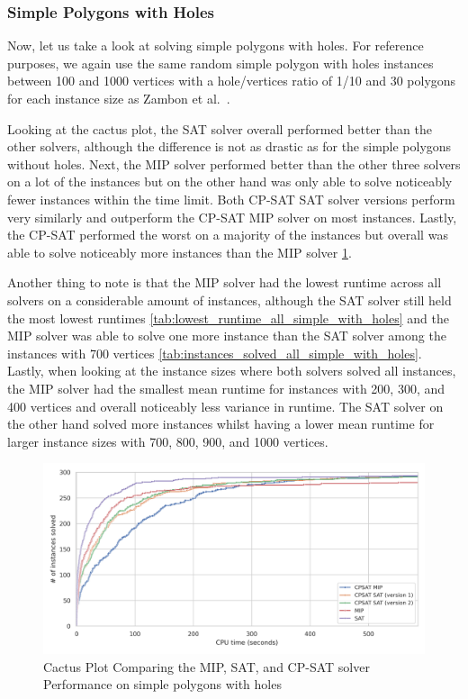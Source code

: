 \subsubsection{Simple Polygons with Holes}
Now, let us take a look at solving simple polygons with holes.
For reference purposes, we again use the same random simple polygon with holes instances between 100 and 1000 vertices with a hole/vertices ratio of 1/10 and 30 polygons for each instance size as Zambon et al.~\cite{art-gallery-instances-page}.

Looking at the cactus plot, the SAT solver overall performed better than the other solvers, although the difference is not as drastic as for the simple polygons without holes. Next, the MIP solver performed better than the other three solvers on a lot of the instances but on the other hand was only able to solve noticeably fewer instances within the time limit. Both CP-SAT SAT solver versions perform very similarly and outperform the CP-SAT MIP solver on most instances. Lastly, the CP-SAT performed the worst on a majority of the instances but overall was able to solve noticeably more instances than the MIP solver \cref{fig:cactus_all_simple_with_holes}.

Another thing to note is that the MIP solver had the lowest runtime across all solvers on a considerable amount of instances, although the SAT solver still held the most lowest runtimes \cref{tab:lowest_runtime_all_simple_with_holes} and the MIP solver was able to solve one more instance than the SAT solver among the instances with 700 vertices \cref{tab:instances_solved_all_simple_with_holes}. Lastly, when looking at the instance sizes where both solvers solved all instances, the MIP solver had the smallest mean runtime for instances with 200, 300, and 400 vertices and overall noticeably less variance in runtime. The SAT solver on the other hand solved more instances whilst having a lower mean runtime for larger instance sizes with 700, 800, 900, and 1000 vertices.

\begin{figure}[htbp]
\centering
\includegraphics[scale=0.7]{Thesis/figures/final_benchmark_cactus_plot_runtime_MIP_SAT_CPSAT_with_holes.png}
\caption{Cactus Plot Comparing the MIP, SAT, and CP-SAT solver Performance on simple polygons with holes}
\label{fig:cactus_all_simple_with_holes}
\end{figure}

